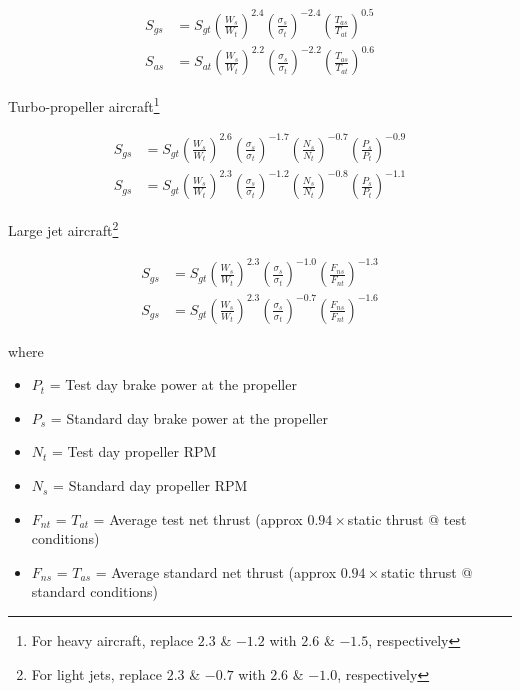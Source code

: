 \documentclass[
]{book}
\providecommand{\tightlist}{%
  \setlength{\itemsep}{0pt}\setlength{\parskip}{0pt}}
\begin{document}
\begin{align} 
S_{gs} &= S_{gt} \left( \frac{W_s}{W_t} \right)^{2.4} \left( \frac{\sigma_s}{\sigma_t} \right)^{-2.4} \left( \frac{T_{as}}{T_{at}} \right)^{0.5} \\ 
S_{as} &= S_{at} \left( \frac{W_s}{W_t} \right)^{2.2} \left( \frac{\sigma_s}{\sigma_t} \right)^{-2.2} \left( \frac{T_{as}}{T_{at}} \right)^{0.6} 
\end{align}

Turbo-propeller aircraft\footnote{For heavy aircraft, replace \(2.3\) \& \(-1.2\) with \(2.6\) \& \(-1.5\), respectively}

\begin{align} 
S_{gs} &= S_{gt} \left( \frac{W_s}{W_t} \right)^{2.6} \left( \frac{\sigma_s}{\sigma_t} \right)^{-1.7} \left( \frac{N_s}{N_t} \right)^{-0.7} \left( \frac{P_s}{P_t} \right)^{-0.9} \\ 
S_{gs} &= S_{gt} \left( \frac{W_s}{W_t} \right)^{2.3} \left( \frac{\sigma_s}{\sigma_t} \right)^{-1.2} \left( \frac{N_s}{N_t} \right)^{-0.8} \left( \frac{P_s}{P_t} \right)^{-1.1} 
\end{align}

Large jet aircraft\footnote{For light jets, replace \(2.3\) \& \(-0.7\) with \(2.6\) \& \(-1.0\), respectively}

\begin{align} 
S_{gs} &= S_{gt} \left( \frac{W_s}{W_t} \right)^{2.3} \left( \frac{\sigma_s}{\sigma_t} \right)^{-1.0} \left( \frac{F_{ns}}{F_{nt}} \right)^{-1.3}  \\ 
S_{gs} &= S_{gt} \left( \frac{W_s}{W_t} \right)^{2.3} \left( \frac{\sigma_s}{\sigma_t} \right)^{-0.7} \left( \frac{F_{ns}}{F_{nt}} \right)^{-1.6} 
\end{align}

where

\begin{itemize}
\tightlist
\item
  \(P_t\) = Test day brake power at the propeller
\item
  \(P_s\) = Standard day brake power at the propeller
\item
  \(N_t\) = Test day propeller \(\text{RPM}\)
\item
  \(N_s\) = Standard day propeller \(\text{RPM}\)
\item
  \(F_{nt}\) = \(T_{at}\) = Average test net thrust (approx \(0.94 \times\)static thrust @ test conditions)
\item
  \(F_{ns}\) = \(T_{as}\) = Average standard net thrust (approx \(0.94 \times\)static thrust @ standard conditions)
\end{itemize}
\end{document}
